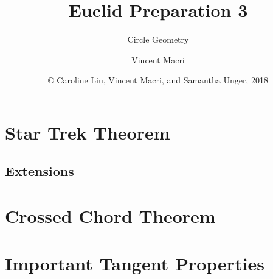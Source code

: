 

\usepackage{adjustbox}
\usepackage{wrapfig}
\usepackage{textpos}
\usepackage{tikz}
\usepackage{tkz-euclide}
\usetikzlibrary{angles,quotes}


\title{Euclid Preparation 3}
\subtitle{Circle Geometry}
\author{Vincent Macri}
\date{\copyright{} Caroline Liu, Vincent Macri, and Samantha Unger, 2018}


	\frame{\titlepage}
	\section{Star Trek Theorem}
		
		\subsection{Extensions}
			
			
			
			
			
	\section{Crossed Chord Theorem}
		
		
	\section{Important Tangent Properties}
		
		

